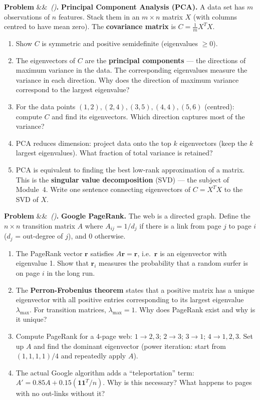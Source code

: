 \documentclass[12pt, a4paper]{article}
\newcounter{problem}
\newenvironment{problem}[1][]{\refstepcounter{problem}\par\vspace{6pt}\noindent\textbf{\color{MidBlue}Problem \theproblem}\ifx&#1&\else\ \textit{(#1)}\fi\textbf{.}\enskip}{\par\vspace{4pt}}
\begin{document}
\begin{problem}
\label{prob:pca}
\textbf{Principal Component Analysis (PCA).} A data set has $m$ observations of $n$ features. Stack them in an $m\times n$ matrix $X$ (with columns centred to have mean zero). The \textbf{covariance matrix} is $C = \frac{1}{m}X^T X$.
\begin{enumerate}[label=(\alph*), topsep=2pt]
  \item Show $C$ is symmetric and positive semidefinite (eigenvalues $\geq 0$).
  \item The eigenvectors of $C$ are the \textbf{principal components} --- the directions of maximum variance in the data. The corresponding eigenvalues measure the variance in each direction. Why does the direction of maximum variance correspond to the largest eigenvalue?
  \item For the data points $(1,2), (2,4), (3,5), (4,4), (5,6)$ (centred): compute $C$ and find its eigenvectors. Which direction captures most of the variance?
  \item PCA reduces dimension: project data onto the top $k$ eigenvectors (keep the $k$ largest eigenvalues). What fraction of total variance is retained?
  \item PCA is equivalent to finding the best low-rank approximation of a matrix. This is the \textbf{singular value decomposition} (SVD) --- the subject of Module~4. Write one sentence connecting eigenvectors of $C = X^TX$ to the SVD of $X$.
\end{enumerate}
\end{problem}

\begin{problem}
\label{prob:pagerank}
\textbf{Google PageRank.} The web is a directed graph. Define the $n\times n$ transition matrix $A$ where $A_{ij} = 1/d_j$ if there is a link from page $j$ to page $i$ ($d_j$ = out-degree of $j$), and 0 otherwise.
\begin{enumerate}[label=(\alph*), topsep=2pt]
  \item The PageRank vector $\mathbf{r}$ satisfies $A\mathbf{r} = \mathbf{r}$, i.e.\ $\mathbf{r}$ is an eigenvector with eigenvalue 1. Show that $\mathbf{r}_i$ measures the probability that a random surfer is on page $i$ in the long run.
  \item The \textbf{Perron-Frobenius theorem} states that a positive matrix has a unique eigenvector with all positive entries corresponding to its largest eigenvalue $\lambda_{\max}$. For transition matrices, $\lambda_{\max} = 1$. Why does PageRank exist and why is it unique?
  \item Compute PageRank for a 4-page web: $1 \to 2,3$; $2 \to 3$; $3 \to 1$; $4 \to 1,2,3$. Set up $A$ and find the dominant eigenvector (power iteration: start from $(1,1,1,1)/4$ and repeatedly apply $A$).
  \item The actual Google algorithm adds a ``teleportation'' term: $A' = 0.85A + 0.15(\mathbf{1}\mathbf{1}^T/n)$. Why is this necessary? What happens to pages with no out-links without it?
\end{enumerate}
\end{problem}
\end{document}
